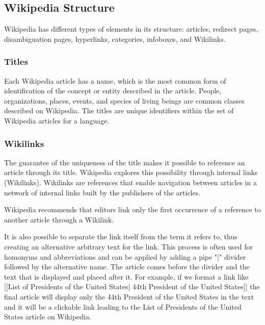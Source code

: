 \subsection{\hspace*{3pt}Wikipedia Structure}

Wikipedia has different types of elements in its structure: articles, redirect pages, disambiguation pages, hyperlinks, categories, infoboxes, and Wikilinks. 

\subsubsection{\hspace*{3pt}Titles}
Each Wikipedia article has a name, which is the most common form of identification of the concept or entity described in the article.  People, organizations, places, events, and species of living beings are common classes described on Wikipedia. The titles are unique identifiers within the set of Wikipedia articles for a language.

\subsubsection{\hspace*{3pt}Wikilinks}

The guarantee of the uniqueness of the title makes it possible to reference an article through its title. Wikipedia explores this possibility through internal links (Wikilinks).   Wikilinks are references that enable navigation between articles in a network of internal links built by the publishers of the articles. 

Wikipedia recommends that editors link only the first occurrence of a reference to another article through a Wikilink. 

It is also possible to separate the link itself from the term it refers to, thus creating an alternative arbitrary text for the link. This process is often used for homonyms and abbreviations and can be applied by adding a pipe "|" divider followed by the alternative name. The article comes before the divider and the text that is displayed and placed after it.  For example, if we format a link like [[List of Presidents of the United States| 44th President of the United States]] the final article will display only the 44th President of the United States in the text and it will be a clickable link leading to the List of Presidents of the United States article on Wikipedia. 

